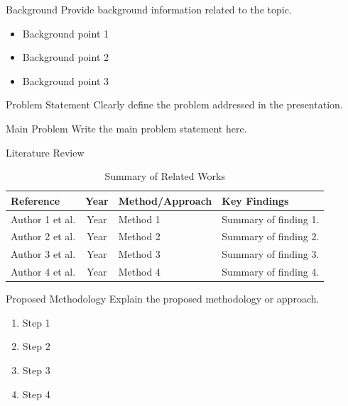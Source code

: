 \documentclass{beamer}
\begin{document}
\begin{frame}{Background}
Provide background information related to the topic.

\vspace{0.4cm}

\begin{itemize}
\item Background point 1
\item Background point 2
\item Background point 3
\end{itemize}
\end{frame}

\begin{frame}{Problem Statement}
Clearly define the problem addressed in the presentation.

\vspace{0.4cm}

\begin{block}{Main Problem}
Write the main problem statement here.
\end{block}
\end{frame}

\begin{frame}{Literature Review}
\begin{table}
\centering
\tiny
\begin{tabular}{p{2.5cm}|c|p{3cm}|p{4.5cm}}
\toprule
Reference & Year & Method/Approach & Key Findings \\
\midrule
Author 1 et al. & Year & Method 1 & Summary of finding 1. \\
Author 2 et al. & Year & Method 2 & Summary of finding 2. \\
Author 3 et al. & Year & Method 3 & Summary of finding 3. \\
Author 4 et al. & Year & Method 4 & Summary of finding 4. \\
\bottomrule
\end{tabular}
\caption{Summary of Related Works}
\end{table}
\end{frame}

\begin{frame}{Proposed Methodology}
Explain the proposed methodology or approach.

\vspace{0.4cm}

\begin{enumerate}
\item Step 1
\item Step 2
\item Step 3
\item Step 4
\end{enumerate}
\end{frame}
\end{document}
